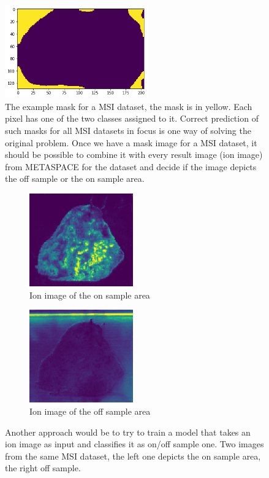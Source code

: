 \documentclass[a4paper]{article}
\begin{document}
    \begin{figure}[H]
        \centering
            \includegraphics[height=4cm]{off_sample_mask_1.png}
        \caption{The example mask for a MSI dataset, the mask is in yellow.
        Each pixel has one of the two classes assigned to it.
        Correct prediction of such masks for all MSI datasets in focus is one way
        of solving the original problem. Once we have a mask image for a MSI dataset,
        it should be possible to combine it with every result image (ion image)
        from METASPACE for the dataset and decide
        if the image depicts the off sample or the on sample area.}
    \end{figure}
    
    \begin{figure}[H]
        \begin{subfigure}[b]{0.5\textwidth}
            \centering
            \includegraphics[width=\textwidth,height=4cm,keepaspectratio]{ion_image_on_sample.png}
            \caption{Ion image of the on sample area}
        \end{subfigure}
        \begin{subfigure}[b]{0.5\textwidth}
            \centering
            \includegraphics[width=\textwidth,height=4cm,keepaspectratio]{ion_image_off_sample.png}
            \caption{Ion image of the off sample area}
        \end{subfigure}
        \caption{Another approach would be to try to train a model that takes an ion image as input
        and classifies it as on/off sample one.
        Two images from the same MSI dataset, the left one depicts the on sample area,
        the right off sample.}
    \end{figure}
    
\end{document}
